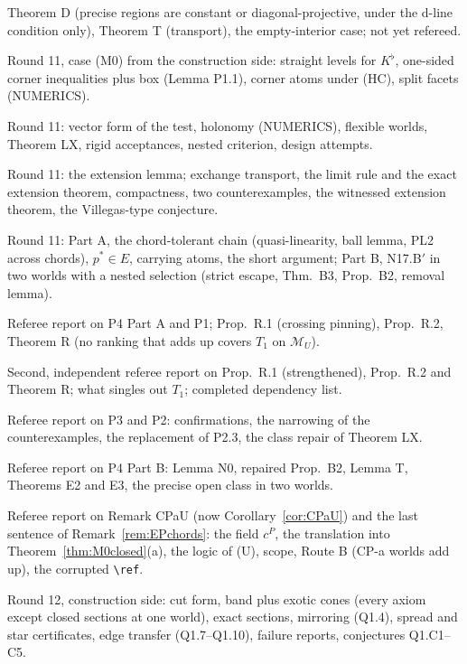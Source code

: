\documentclass[11pt]{article}
\theoremstyle{definition}
\theoremstyle{remark}
\newcommand{\M}{\mathcal M}
\begin{document}
\begin{description}[leftmargin=*,font=\normalfont\ttfamily,style=nextline]
\item[PropD\_notes.md] Theorem D (precise regions are constant or diagonal-projective, under the d-line condition only), Theorem T (transport), the empty-interior case; not yet refereed.
\item[P1\_notes.md] Round 11, case (M0) from the construction side: straight levels for $K^\flat$, one-sided corner inequalities plus box (Lemma P1.1), corner atoms under (HC), split facets (NUMERICS).
\item[P2\_notes.md] Round 11: vector form of the test, holonomy (NUMERICS), flexible worlds, Theorem LX, rigid acceptances, nested criterion, design attempts.
\item[P3\_notes.md] Round 11: the extension lemma; exchange transport, the limit rule and the exact extension theorem, compactness, two counterexamples, the witnessed extension theorem, the Villegas-type conjecture.
\item[P4\_notes.md] Round 11: Part A, the chord-tolerant chain (quasi-linearity, ball lemma, PL2 across chords), $p^*\in E$, carrying atoms, the short argument; Part B, N17.B$'$ in two worlds with a nested selection (strict escape, Thm.~B3, Prop.~B2, removal lemma).
\item[M0\_referee.md] Referee report on P4 Part A and P1; Prop.~R.1 (crossing pinning), Prop.~R.2, Theorem R (no ranking that adds up covers $T_1$ on $\M_U$).
\item[M0\_second\_referee.md] Second, independent referee report on Prop.~R.1 (strengthened), Prop.~R.2 and Theorem R; what singles out $T_1$; completed dependency list.
\item[P2P3\_referee.md] Referee report on P3 and P2: confirmations, the narrowing of the counterexamples, the replacement of P2.3, the class repair of Theorem LX.
\item[P4B\_referee.md] Referee report on P4 Part B: Lemma N0, repaired Prop.~B2, Lemma T, Theorems E2 and E3, the precise open class in two worlds.
\item[CPaU\_referee.md] Referee report on Remark CPaU (now Corollary~\ref{cor:CPaU}) and the last sentence of Remark~\ref{rem:EPchords}: the field $c^P$, the translation into Theorem~\ref{thm:M0closed}(a), the logic of (U), scope, Route B (CP-a worlds add up), the corrupted \texttt{\textbackslash ref}.
\item[Q1\_notes.md] Round 12, construction side: cut form, band plus exotic cones (every axiom except closed sections at one world), exact sections, mirroring (Q1.4), spread and star certificates, edge transfer (Q1.7--Q1.10), failure reports, conjectures Q1.C1--C5.

\end{description}
\end{document}
